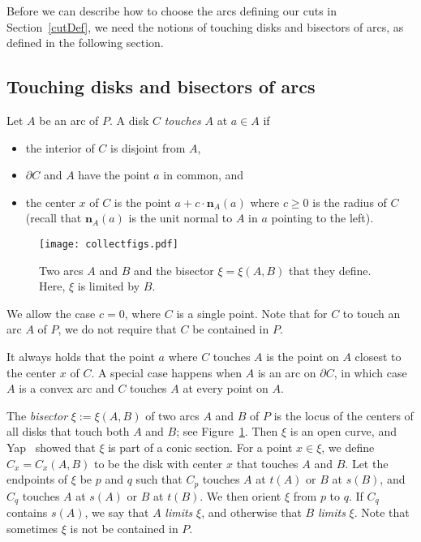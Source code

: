 \documentclass{article}
\newcommand{\PP}{P}
\newcommand{\nn}{\mathbf n}
\newcommand{\start}{s}
\newcommand{\terminal}{t}
\newcommand{\arcA}{A}
\newcommand{\arcB}{B}
\newcommand{\mydef}{:=}
\begin{document}
Before we can describe how to choose the arcs defining our cuts in Section~\ref{cutDef}, we need the notions of touching disks and bisectors of arcs, as defined in the following section.

\subsection{Touching disks and bisectors of arcs}

Let $\arcA$ be an arc of $\PP$.
A disk $C$ \emph{touches} $\arcA$ at $a\in \arcA$ if
\begin{itemize}
\item
the interior of $C$ is disjoint from $\arcA$,

\item
$\partial C$ and $\arcA$ have the
point $a$ in common, and

\item
the center $x$ of $C$ is the point $a+c\cdot \nn_\arcA(a)$ where $c\geq 0$ is the radius of $C$ (recall that $\nn_\arcA(a)$ is the unit normal to $A$ in $a$ pointing to the left).
\end{itemize}

\begin{figure}
\centering
\texttt{[image: collectfigs.pdf]}
\caption{
Two arcs $\arcA$ and $\arcB$ and the bisector $\xi=\xi(\arcA,\arcB)$ that they define.
Here, $\xi$ is limited by $\arcB$.
}
\label{fig:bisector}
\end{figure}

We allow the case $c=0$, where $C$ is a single point.
Note that for $C$ to touch an arc $\arcA$ of $\PP$, we do not require that $C$ be contained in $\PP$.

It always holds that the point $a$ where $C$ touches $\arcA$ is the point on $\arcA$ closest to the center $x$ of $C$.
A special case happens when $\arcA$ is an arc on $\partial C$, in which case $\arcA$ is a convex arc and $C$ touches $\arcA$ at every point on $\arcA$.

The \emph{bisector} $\xi\mydef \xi(\arcA,\arcB)$ of two arcs $\arcA$ and $\arcB$ of $\PP$ is the locus of the centers of all disks that touch both $\arcA$ and $\arcB$; see Figure~\ref{fig:bisector}.
Then $\xi$ is an open curve, and Yap~\cite{yap1987ano} showed that $\xi$ is part of a conic section.
For a point $x\in\xi$, we define $C_x=C_x(\arcA,\arcB)$ to be the disk with center $x$ that touches $\arcA$ and $\arcB$.
Let the endpoints of $\xi$ be $p$ and $q$ such that $C_p$ touches $\arcA$ at $\terminal(\arcA)$ or $\arcB$ at $\start(\arcB)$, and $C_q$ touches $\arcA$ at $\start(\arcA)$ or $\arcB$ at $\terminal(\arcB)$.
We then orient $\xi$ from $p$ to $q$.
If $C_q$ contains $\start(\arcA)$, we say that $\arcA$ \emph{limits} $\xi$, and otherwise that $\arcB$ \emph{limits} $\xi$.
Note that sometimes $\xi$ is not be contained in $\PP$.
\end{document}

